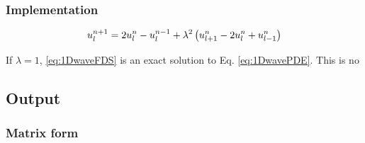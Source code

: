 \subsubsection{Implementation}
\begin{equation}\label{eq:1DwaveFDS}
    u_l^{n+1} = 2 u_l^n - u_l^{n-1} + \lambda^2 \left(u_{l+1}^n - 2 u_l^n + u_{l-1}^n\right)
\end{equation}

If $\lambda = 1$, \eqref{eq:1DwaveFDS} is an exact solution to Eq. \eqref{eq:1DwavePDE}. This is no

\subsection{Output}


\subsubsection{Matrix form}
